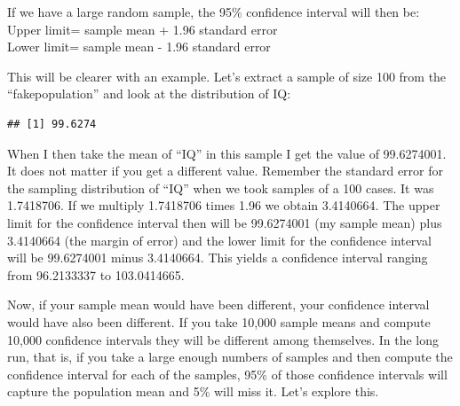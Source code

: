 \documentclass[]{book}
\newenvironment{Shaded}{\begin{snugshade}}{\end{snugshade}}
\newcommand{\DecValTok}[1]{\textcolor[rgb]{0.00,0.00,0.81}{#1}}
\newcommand{\KeywordTok}[1]{\textcolor[rgb]{0.13,0.29,0.53}{\textbf{#1}}}
\newcommand{\NormalTok}[1]{#1}
\newcommand{\OperatorTok}[1]{\textcolor[rgb]{0.81,0.36,0.00}{\textbf{#1}}}
\newcommand{\StringTok}[1]{\textcolor[rgb]{0.31,0.60,0.02}{#1}}
\theoremstyle{definition}
\theoremstyle{definition}
\theoremstyle{definition}
\theoremstyle{remark}
\begin{document}
If we have a large random sample, the 95\% confidence interval will then
be:\\
Upper limit= sample mean + 1.96 standard error\\
Lower limit= sample mean - 1.96 standard error

This will be clearer with an example. Let's extract a sample of size 100
from the ``fakepopulation'' and look at the distribution of IQ:

\begin{Shaded}
\end{Shaded}

\begin{verbatim}
## [1] 99.6274
\end{verbatim}

When I then take the mean of ``IQ'' in this sample I get the value of
99.6274001. It does not matter if you get a different value. Remember
the standard error for the sampling distribution of ``IQ'' when we took
samples of a 100 cases. It was 1.7418706. If we multiply 1.7418706 times
1.96 we obtain 3.4140664. The upper limit for the confidence interval
then will be 99.6274001 (my sample mean) plus 3.4140664 (the margin of
error) and the lower limit for the confidence interval will be
99.6274001 minus 3.4140664. This yields a confidence interval ranging
from 96.2133337 to 103.0414665.

Now, if your sample mean would have been different, your confidence
interval would have also been different. If you take 10,000 sample means
and compute 10,000 confidence intervals they will be different among
themselves. In the long run, that is, if you take a large enough numbers
of samples and then compute the confidence interval for each of the
samples, 95\% of those confidence intervals will capture the population
mean and 5\% will miss it. Let's explore this.
\end{document}
